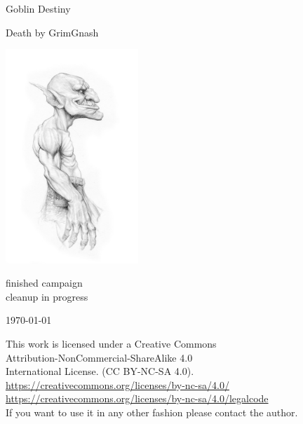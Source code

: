 \begin{center}

\huge
Goblin Destiny

\vspace{0.3\baselineskip}

\large
Death by GrimGnash

\vspace{2cm}

\includegraphics[width=50mm]{./fig/goblinside.jpg}

\vspace{2cm}

\normalsize
finished campaign\\
cleanup in progress\\

\vfill

\today

\end{center}






\clearpage
\thispagestyle{empty}
\raggedbottom

\vsmall
\noindent 
This work is licensed under a Creative Commons \\
Attribution-NonCommercial-ShareAlike 4.0 \\
International License. (CC BY-NC-SA 4.0).\\
\url{https://creativecommons.org/licenses/by-nc-sa/4.0/} \\
\url{https://creativecommons.org/licenses/by-nc-sa/4.0/legalcode} \\
If you want to use it in any other fashion please contact the author.

